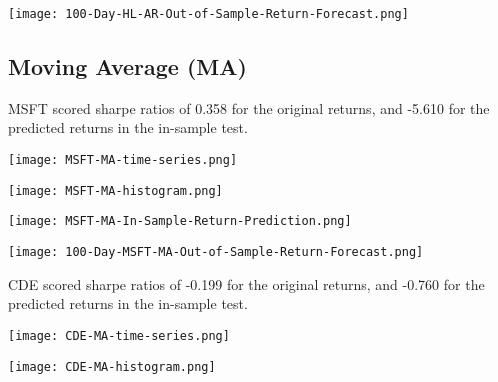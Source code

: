 \begin{center}
  
    \texttt{[image: 100-Day-HL-AR-Out-of-Sample-Return-Forecast.png]}
    \label{fig:nonfloat}
\end{center}

\subsection{Moving Average (MA)}

MSFT scored sharpe ratios of 0.358 for the original returns, and -5.610 for the predicted returns in the in-sample test.

\begin{center}
    \texttt{[image: MSFT-MA-time-series.png]}
  \label{fig:nonfloat}
\end{center}

\begin{center}
    \texttt{[image: MSFT-MA-histogram.png]}
    \label{fig:nonfloat}
\end{center}

\begin{center}  
    \texttt{[image: MSFT-MA-In-Sample-Return-Prediction.png]}
    \label{fig:nonfloat}
\end{center}

\begin{center}  
    \texttt{[image: 100-Day-MSFT-MA-Out-of-Sample-Return-Forecast.png]}
    \label{fig:nonfloat}
\end{center}

CDE scored sharpe ratios of -0.199 for the original returns, and -0.760 for the predicted returns in the in-sample test.

\begin{center}
    \texttt{[image: CDE-MA-time-series.png]}
    \label{fig:nonfloat}
\end{center}

\begin{center}  
    \texttt{[image: CDE-MA-histogram.png]}
    \label{fig:nonfloat}
\end{center}

